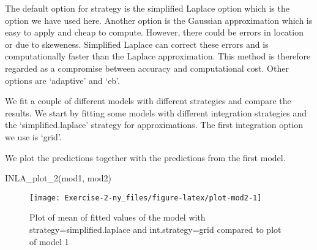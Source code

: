 \documentclass[
]{article}
\newenvironment{Shaded}{\begin{snugshade}}{\end{snugshade}}
\newcommand{\AttributeTok}[1]{\textcolor[rgb]{0.77,0.63,0.00}{#1}}
\newcommand{\CommentTok}[1]{\textcolor[rgb]{0.56,0.35,0.01}{\textit{#1}}}
\newcommand{\FunctionTok}[1]{\textcolor[rgb]{0.00,0.00,0.00}{#1}}
\newcommand{\NormalTok}[1]{#1}
\newcommand{\OtherTok}[1]{\textcolor[rgb]{0.56,0.35,0.01}{#1}}
\newcommand{\SpecialCharTok}[1]{\textcolor[rgb]{0.00,0.00,0.00}{#1}}
\newcommand{\StringTok}[1]{\textcolor[rgb]{0.31,0.60,0.02}{#1}}
\begin{document}
The default option for strategy is the simplified Laplace option which is the option we have used here. Another option is the Gaussian approximation which is easy to apply and cheap to compute. However, there could be errors in location or due to skeweness. Simplified Laplace can correct these errors and is computationally faster than the Laplace approximation.
This method is therefore regarded as a compromise between accuracy and computational cost. Other options are `adaptive' and `eb'.

We fit a couple of different models with different strategies and compare the results. We start by fitting some models with different integration strategies and the `simplified.laplace' strategy for approximations. The first integration option we use is `grid'.

\begin{Shaded}
\end{Shaded}

We plot the predictions together with the predictions from the first model.

\begin{Shaded}
\begin{Highlighting}[]
\FunctionTok{INLA\_plot\_2}\NormalTok{(mod1, mod2)}
\end{Highlighting}
\end{Shaded}

\begin{figure}

{\centering \texttt{[image: Exercise-2-ny\_files/figure-latex/plot-mod2-1]} 

}

\caption{Plot of mean of fitted values of the model with strategy=simplified.laplace and int.strategy=grid compared to plot of model 1}\label{fig:plot-mod2}
\end{figure}
\end{document}
